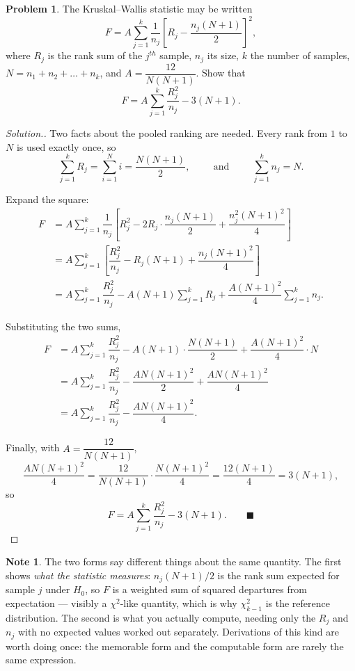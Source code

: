 \documentclass[11pt,a4paper]{article}
\theoremstyle{definition}
\newtheorem{note}[thm]{Note}
\newtheorem{problemx}{Problem}[section]
\newenvironment{problem}{\begin{problemx}}{\end{problemx}}
\newenvironment{solution}
  {\renewcommand{\qedsymbol}{}\begin{proof}[\textit{Solution}.]}
  {\end{proof}}
\begin{document}
\begin{problem}
The Kruskal--Wallis statistic may be written
$$F=A\sum^{k}_{j=1}\dfrac{1}{n_j}\left[R_j-\dfrac{n_j(N+1)}{2}\right]^{2},$$
where $R_j$ is the rank sum of the $j^{th}$ sample, $n_j$ its size, $k$ the number
of samples, $N=n_1+n_2+\dots+n_k$, and $A=\dfrac{12}{N(N+1)}$. Show that
$$F=A\sum^{k}_{j=1}\dfrac{R_j^{2}}{n_j}-3(N+1).$$
\end{problem}

\begin{solution}
Two facts about the pooled ranking are needed. Every rank from $1$ to $N$ is used
exactly once, so
$$\sum^{k}_{j=1}R_j=\sum^{N}_{i=1}i=\dfrac{N(N+1)}{2},
\hspace{1cm}\text{and}\hspace{1cm}\sum^{k}_{j=1}n_j=N .$$

Expand the square:
\begin{align*}
F &=A\sum^{k}_{j=1}\dfrac{1}{n_j}
   \left[R_j^{2}-2R_j\cdot\dfrac{n_j(N+1)}{2}+\dfrac{n_j^{2}(N+1)^{2}}{4}\right]\\[4pt]
  &=A\sum^{k}_{j=1}\left[\dfrac{R_j^{2}}{n_j}-R_j(N+1)
     +\dfrac{n_j(N+1)^{2}}{4}\right]\\[4pt]
  &=A\sum^{k}_{j=1}\dfrac{R_j^{2}}{n_j}
     -A(N+1)\sum^{k}_{j=1}R_j
     +\dfrac{A(N+1)^{2}}{4}\sum^{k}_{j=1}n_j .
\end{align*}

Substituting the two sums,
\begin{align*}
F &=A\sum^{k}_{j=1}\dfrac{R_j^{2}}{n_j}
     -A(N+1)\cdot\dfrac{N(N+1)}{2}
     +\dfrac{A(N+1)^{2}}{4}\cdot N\\[4pt]
  &=A\sum^{k}_{j=1}\dfrac{R_j^{2}}{n_j}
     -\dfrac{AN(N+1)^{2}}{2}+\dfrac{AN(N+1)^{2}}{4}\\[4pt]
  &=A\sum^{k}_{j=1}\dfrac{R_j^{2}}{n_j}-\dfrac{AN(N+1)^{2}}{4} .
\end{align*}

Finally, with $A=\dfrac{12}{N(N+1)}$,
$$\dfrac{AN(N+1)^{2}}{4}
=\dfrac{12}{N(N+1)}\cdot\dfrac{N(N+1)^{2}}{4}
=\dfrac{12(N+1)}{4}=3(N+1),$$
so
$$F=A\sum^{k}_{j=1}\dfrac{R_j^{2}}{n_j}-3(N+1). \qquad\blacksquare$$
\end{solution}

\begin{note}
The two forms say different things about the same quantity. The first shows
\emph{what the statistic measures}: $n_j(N+1)/2$ is the rank sum expected for
sample $j$ under $H_0$, so $F$ is a weighted sum of squared departures from
expectation --- visibly a $\chi^{2}$-like quantity, which is why $\chi^{2}_{k-1}$
is the reference distribution. The second is what you actually compute, needing
only the $R_j$ and $n_j$ with no expected values worked out separately. Derivations
of this kind are worth doing once: the memorable form and the computable form are
rarely the same expression.
\end{note}
\end{document}
